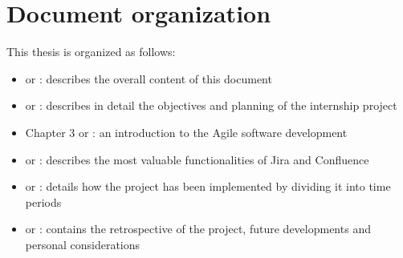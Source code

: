 \section{Document organization}
	This thesis is organized as follows:
	\begin{itemize}
		\item {} or : describes the overall content of this document
		\item {} or : describes in detail the objectives and planning of the internship project
		\item {} Chapter 3 or : an introduction to the Agile software development
		\item {} or : describes the most valuable functionalities of Jira and Confluence
		\item {} or : details how the project has been implemented by dividing it into time periods
		\item {} or : contains the retrospective of the project, future developments and personal considerations
	\end{itemize}
	
